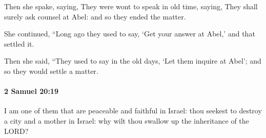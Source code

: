 			\begin{versebox}
					\item[BHS] 
					\item[ASV] Then she spake, saying, They were wont to speak in old time, saying, They shall surely ask counsel at Abel: and so they ended the matter.
					\item[NIV] She continued, “Long ago they used to say, ‘Get your answer at Abel,’ and that settled it.
					\item[NRSV] Then she said, “They used to say in the old days, ‘Let them inquire at Abel’; and so they would settle a matter.
			\end{versebox}

		\paragraph{2 Samuel 20:19} %
			\label{2SAMUEL-20-19}

			I am one of them that are peaceable and faithful in Israel: thou seekest to destroy a city and a mother in Israel: why wilt thou swallow up the inheritance of the LORD?

